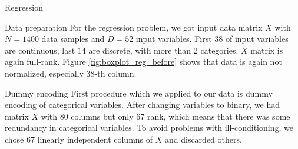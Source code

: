 \documentclass{article}
\begin{document}
\begin{section}{Regression}
\begin{subsection}{Data preparation}
For the regression problem, we got input data matrix $X$ with $N=1400$ data samples and $D = 52$ input variables. First $38$ of input variables are continuous, last $14$ are discrete, with more than $2$ categories. $X$ matrix is again full-rank. Figure \ref{fig:boxplot_reg_before} shows that data is again not normalized, especially $38$-th column. 

\begin{figure}[!h]
\center
{}
\hfill
{}
\caption{}
\end{figure}
\begin{subsubsection}{Dummy encoding}
First procedure which we applied to our data is dummy encoding of categorical variables. After changing variables to binary, we had matrix $X$ with $80$ columns but only $67$ rank, which means that there was some redundancy in categorical variables. To avoid problems with ill-conditioning, we chose $67$ linearly independent columns of $X$ and discarded others.
\end{subsubsection}


\end{subsection}
\end{section}
\end{document}
